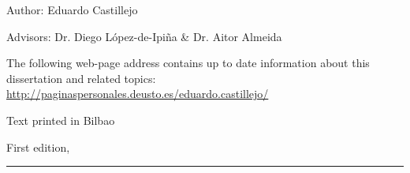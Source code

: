 
\thispagestyle{empty}

\hfill

\vfill

\medskip






Author: Eduardo Castillejo

Advisors: Dr. Diego {López-de-Ipiña} \& Dr. Aitor Almeida



\vfill

\vfill

\noindent
The following web-page address contains up to date information about this 
dissertation and related topics: \\
\url{http://paginaspersonales.deusto.es/eduardo.castillejo/}


\noindent
Text printed in Bilbao

\noindent
First edition, 
\monthname \ \the\year

\vspace{1cm}
\hrule
\bigskip

\cleardoublepage

%
%
%
%
%
%

